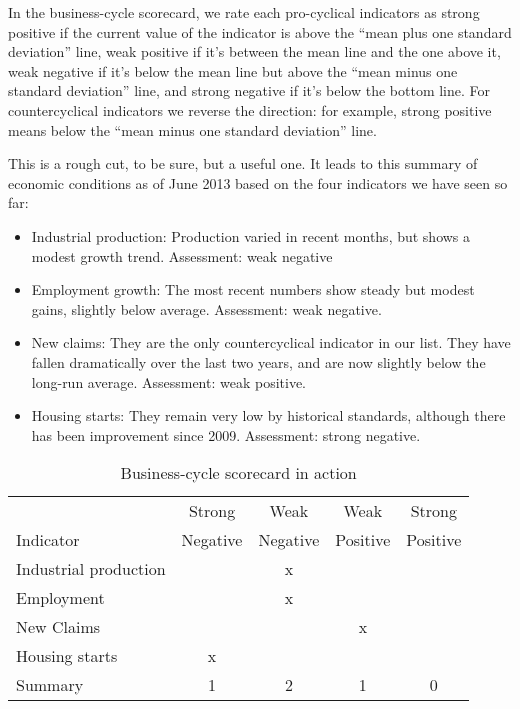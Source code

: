 In the business-cycle scorecard,
we rate each pro-cyclical indicators 
 as strong positive if
the current value of the indicator is above the
``mean plus one standard deviation'' line,
weak positive if it's between the mean line and the one above it,
weak negative if it's below the mean line but above
the ``mean minus one standard deviation'' line,
and strong negative if it's below the bottom line.
For   countercyclical   
 indicators we reverse the direction:
for example, strong positive means below the ``mean minus one standard deviation'' line.

This is a rough cut, to be sure, but a useful one.
It leads to this summary of economic conditions as of June 2013
based on the four indicators we have seen so far:
\begin{itemize}
    \item Industrial production:  Production varied in recent months, but shows a modest growth trend. Assessment:  weak negative

    \item Employment growth:  The most recent numbers show steady but modest gains, slightly below average. Assessment:  weak negative.

    \item New claims:  They are the only countercyclical indicator in our list. They have fallen dramatically over the last two years, and are now slightly below the long-run average. Assessment:  weak positive.

    \item Housing starts:  They remain very low by historical standards, although there has been improvement since 2009. Assessment:  strong negative.
\end{itemize}


\begin{table}[!ht]
\centering
\caption{Business-cycle scorecard in action} %
\begin{tabular}{lcccc}
\toprule
            &  Strong    &  Weak  &  Weak   &  Strong  \\
Indicator   &  Negative  & Negative & Positive & Positive \\
\midrule
Industrial production  &&x&  \\
Employment             && x &  \\
New Claims             && &x \\
Housing starts         & x &  \\
\midrule
Summary                & 1 & 2 & 1 & 0 \\
\bottomrule
\end{tabular}
\label{tab:scorecard}
\end{table}

